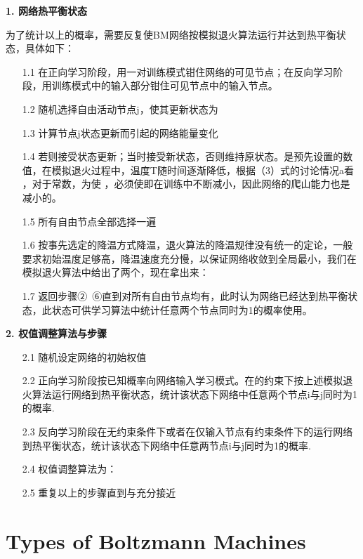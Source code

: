\noindent
{\bf 1. 网络热平衡状态}

为了统计以上的概率，需要反复使BM网络按模拟退火算法运行并达到热平衡状态，具体如下：
\begin{itemize}
\setlength{\parskip}{0pt}
\item[1.1]
在正向学习阶段，用一对训练模式钳住网络的可见节点；在反向学习阶段，用训练模式中的输入部分钳住可见节点中的输入节点。  
\item[1.2]
随机选择自由活动节点j，使其更新状态为  
\item[1.3]
计算节点j状态更新而引起的网络能量变化       
\item[1.4]
若则接受状态更新；当时接受新状态，否则维持原状态。是预先设置的数值，在模拟退火过程中，温度T随时间逐渐降低，根据（3）式的讨论情况a看 ，对于常数，为使 ，必须使即在训练中不断减小，因此网络的爬山能力也是减小的。  
\item[1.5]
所有自由节点全部选择一遍  
\item[1.6]
按事先选定的降温方式降温，退火算法的降温规律没有统一的定论，一般要求初始温度足够高，降温速度充分慢，以保证网络收敛到全局最小，我们在模拟退火算法中给出了两个，现在拿出来：  
\item[1.7]
返回步骤②~⑥直到对所有自由节点均有，此时认为网络已经达到热平衡状态，此状态可供学习算法中统计任意两个节点同时为1的概率使用。    
\end{itemize}

\noindent
{\bf 2. 权值调整算法与步骤}

\begin{itemize}
\setlength{\parskip}{0pt}
\item[2.1]
随机设定网络的初始权值
\item[2.2]
正向学习阶段按已知概率向网络输入学习模式。在的约束下按上述模拟退火算法运行网络到热平衡状态，统计该状态下网络中任意两个节点i与j同时为1的概率.
\item[2.3]
反向学习阶段在无约束条件下或者在仅输入节点有约束条件下的运行网络到热平衡状态，统计该状态下网络中任意两节点i与j同时为1的概率.
\item[2.4]
权值调整算法为：
\item[2.5]
重复以上的步骤直到与充分接近
\end{itemize}


\section{Types of Boltzmann Machines}

